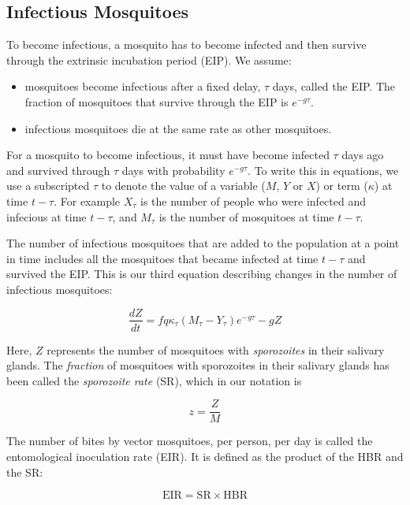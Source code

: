 \documentclass[
]{book}
\begin{document}
\hypertarget{infectious-mosquitoes}{%
\subsection{Infectious Mosquitoes}\label{infectious-mosquitoes}}

To become infectious, a mosquito has to become infected and then survive through the extrinsic incubation period (EIP). We assume:

\begin{itemize}
\item
  mosquitoes become infectious after a fixed delay, \(\tau\) days, called the EIP. The fraction of mosquitoes that survive through the EIP is \(e^{-g \tau}\).
\item
  infectious mosquitoes die at the same rate as other mosquitoes.
\end{itemize}

For a mosquito to become infectious, it must have become infected \(\tau\) days ago and survived through \(\tau\) days with probability \(e^{-g\tau}\). To write this in equations, we use a subscripted \(\tau\) to denote the value of a variable (\(M\), \(Y\) or \(X\)) or term (\(\kappa\)) at time \(t-\tau\). For example \(X_\tau\) is the number of people who were infected and infecious at time \(t-\tau\), and \(M_\tau\) is the number of mosquitoes at time \(t-\tau\).

The number of infectious mosquitoes that are added to the population at a point in time includes all the mosquitoes that became infected at time \(t-\tau\) and survived the EIP. This is our third equation describing changes in the number of infectious mosquitoes:

\begin{equation}
\frac{dZ}{dt} = f q  \kappa_\tau (M_\tau-Y_\tau) e^{-g\tau} -g Z
\end{equation}

Here, \(Z\) represents the number of mosquitoes with \emph{sporozoites} in their salivary glands. The \emph{fraction} of mosquitoes with sporozoites in their salivary glands has been called the \emph{sporozoite rate} (SR), which in our notation is

\[ z = \frac{Z}{M}\]

The number of bites by vector mosquitoes, per person, per day is called the entomological inoculation rate (EIR). It is defined as the product of the HBR and the SR:

\[\mbox{EIR} = \mbox{SR} \times \mbox{HBR}\]
\end{document}
